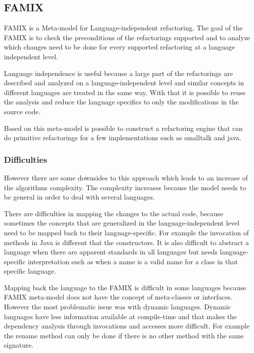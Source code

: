 \subsection{FAMIX} %

FAMIX \cite{tichelaar2000meta} is a  Meta-model for Language-independent refactoring.
The goal of the FAMIX is to check the preconditions of the refactorings supported and to analyze which changes need to be done for every supported refactoring at a language independent level.

Language independence is useful because a large part of the refactorings are described and analyzed on a language-independent level and similar concepts in different languages are treated in the same way. 
With that it is possible to reuse the analysis and reduce the language specifics to only the modifications in the source code.

Based on this meta-model is possible to construct a refactoring engine that can do primitive refactorings for a few implementations such as smalltalk and java.

\subsubsection{Difficulties}
However there are some downsides to this approach which leads to an increase of the algorithms complexity. 
The complexity increases because the model needs to be general in order to deal with several languages. 

There are difficulties in mapping the changes to the actual code, because sometimes the concepts that are generalized in the language-independent level need to be mapped back to their language-specific.
For example the invocation of methods in Java is different that the constructors.
It is also difficult to abstract a language when there are apparent standards in all languages but needs language-specific interpretation such as when a name is a valid name for a class in that specific language.

Mapping back the language to the FAMIX is difficult in some languages because FAMIX meta-model does not have the concept of meta-classes or interfaces.
However the most problematic issue was with dynamic languages. Dynamic languages have less information available at compile-time and that makes the dependency analysis  through invocations and accesses more difficult. For example the rename method can only be done if there is no other method with the same signature.

